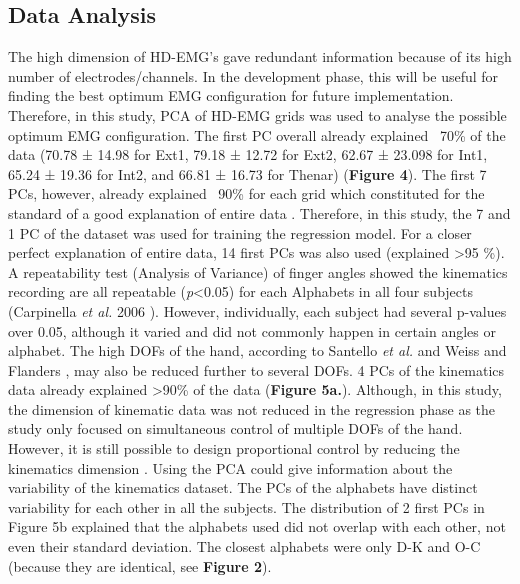 \documentclass[conference]{IEEEtran}
\begin{document}
\subsection{Data Analysis}
The high dimension of HD-EMG’s gave redundant information because of its high number of 
electrodes/channels. In the development phase, this will be useful for finding the best optimum EMG
configuration for future implementation. Therefore, in this study, PCA of HD-EMG grids was used to 
analyse the possible optimum EMG configuration. The first PC overall already explained ~70\% of the data 
(70.78 ± 14.98 for Ext1, 79.18 ± 12.72 for Ext2, 62.67 ± 23.098 for Int1, 65.24 ± 19.36 for Int2, and 66.81 
± 16.73 for Thenar) (\textbf{Figure 4}). The first 7 PCs, however, already explained ~90\% for each grid which 
constituted for the standard of a good explanation of entire data \cite{b9}\cite{b23}. Therefore, in this study, the 7 and 1 
PC of the dataset was used for training the regression model. For a closer perfect explanation of entire data, 
14 first PCs was also used (explained >95 \%).
A repeatability test (Analysis of Variance) of finger angles showed the kinematics recording are all 
repeatable (\textit{p}<0.05) for each Alphabets in all four subjects (Carpinella \textit{et al.} 2006 \cite{b25}). However, 
individually, each subject had several p-values over 0.05, although it varied and did not commonly happen 
in certain angles or alphabet.
The high DOFs of the hand, according to Santello \textit{et al.} \cite{b32} and Weiss and Flanders \cite{b28}, may also be 
reduced further to several DOFs. 4 PCs of the kinematics data already explained >90\% of the data (\textbf{Figure 5a.}). Although, in this study, the dimension of kinematic data was not reduced in the regression phase as the 
study only focused on simultaneous control of multiple DOFs of the hand. However, it is still possible to
design proportional control by reducing the kinematics dimension \cite{b36}.
Using the PCA could give information about the variability of the kinematics dataset. The PCs of the
alphabets have distinct variability for each other in all the subjects. The distribution of 2 first PCs in Figure 
5b explained that the alphabets used did not overlap with each other, not even their standard deviation. The 
closest alphabets were only D-K and O-C (because they are identical, see \textbf{Figure 2}).
\end{document}
